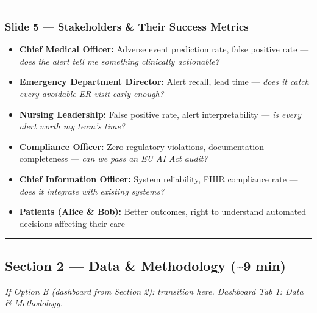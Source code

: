 \documentclass[11pt,a4paper]{article}
\begin{document}
\noindent\rule{\linewidth}{0.4pt}

\subsubsection{Slide 5 --- Stakeholders \& Their Success Metrics}
\begin{itemize}
\item \textbf{Chief Medical Officer:} Adverse event prediction rate, false positive rate --- \emph{does the alert tell me something clinically actionable?}
\item \textbf{Emergency Department Director:} Alert recall, lead time --- \emph{does it catch every avoidable ER visit early enough?}
\item \textbf{Nursing Leadership:} False positive rate, alert interpretability --- \emph{is every alert worth my team's time?}
\item \textbf{Compliance Officer:} Zero regulatory violations, documentation completeness --- \emph{can we pass an EU AI Act audit?}
\item \textbf{Chief Information Officer:} System reliability, FHIR compliance rate --- \emph{does it integrate with existing systems?}
\item \textbf{Patients (Alice \& Bob):} Better outcomes, right to understand automated decisions affecting their care
\end{itemize}

\noindent\rule{\linewidth}{0.4pt}

\subsection{Section 2 --- Data \& Methodology (\textasciitilde{}9 min)}
\emph{If Option B (dashboard from Section 2): transition here. Dashboard Tab 1: Data \& Methodology.}
\end{document}
